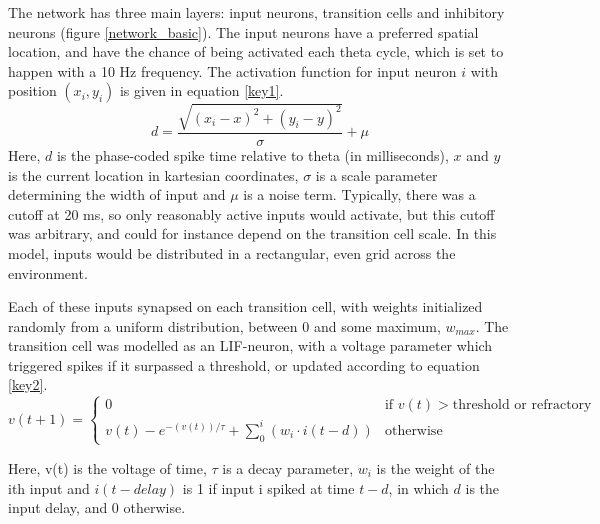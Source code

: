 \documentclass{article}
\begin{document}
    The network has three main layers: input neurons, transition cells and inhibitory neurons (figure \ref{network_basic}). The input neurons have a preferred spatial location, and have the chance of being activated each theta cycle, which is set to happen with a 10 Hz frequency. The activation function for input neuron \(i\) with position \((x_i, y_i)\) is given in equation \ref{key1}. \begin{equation} \label{key1} d = \frac{\sqrt{(x_i - x)^2 + (y_i - y)^2}}{\sigma} + \mu\end{equation}
    Here, \(d\) is the phase-coded spike time relative to theta (in milliseconds), \(x\) and \(y\) is the current location in kartesian coordinates, \(\sigma\) is a scale parameter determining the width of input and \(\mu\) is a noise term. Typically, there was a cutoff at 20 ms, so only reasonably active inputs would activate, but this cutoff was arbitrary, and could for instance depend on the transition cell scale. In this model, inputs would be distributed in a rectangular, even grid across the environment.
    
    Each of these inputs synapsed on each transition cell, with weights initialized randomly from a uniform distribution, between 0 and some maximum, \(w_{max}\). The transition cell was modelled as an LIF-neuron, with a voltage parameter which triggered spikes if it surpassed a threshold, or updated according to equation \ref{key2}.
    \begin{equation} \label{key2} v(t+1) =  \begin{cases} 0 & \text{if } v(t) > \text{threshold or refractory}\\ v(t) - e^{-(v(t)) / \tau} + \sum_{0}^{i} (w_{i} \cdot i(t-d)) & \text{otherwise} \end{cases} \end{equation}
    
    Here, v(t) is the voltage of time, \(\tau\) is a decay parameter, \(w_{i}\) is the weight of the ith input and \(i(t-delay)\) is 1 if input i spiked at time \(t-d\), in which \(d\) is the input delay, and 0 otherwise.
\end{document}
